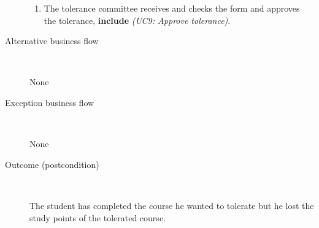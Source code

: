 \begin{description}
\begin{enumerate}
	  	\item The tolerance committee receives and checks the form and approves the
	  	tolerance, \textbf{include} \emph{(UC9: Approve tolerance)}.
	\end{enumerate}
	\item[Alternative business flow] \ 
		\par None
	\item[Exception business flow] \ 
		\par None
	\item[Outcome (postcondition)] \ 
		\par The student has completed the course he wanted to tolerate but he lost
		the study points of the tolerated course.
\end{description}
